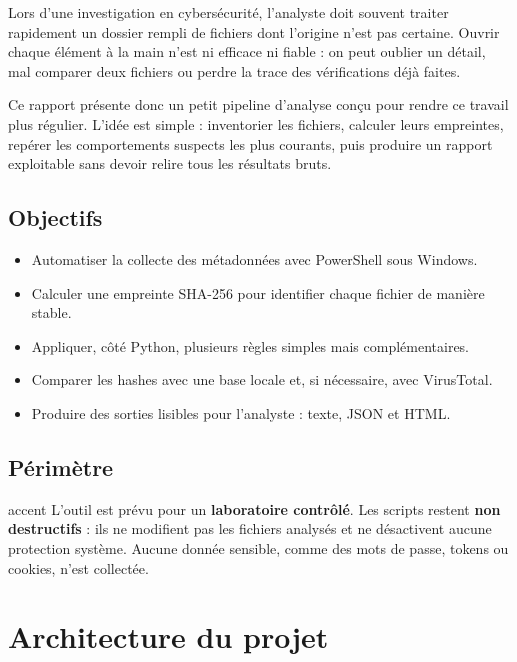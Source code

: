 \documentclass[12pt,a4paper]{article}
\begin{document}
Lors d'une investigation en cybersécurité, l'analyste doit souvent traiter rapidement un dossier rempli de fichiers dont l'origine n'est pas certaine. Ouvrir chaque élément à la main n'est ni efficace ni fiable : on peut oublier un détail, mal comparer deux fichiers ou perdre la trace des vérifications déjà faites.

Ce rapport présente donc un petit pipeline d'analyse conçu pour rendre ce travail plus régulier. L'idée est simple : inventorier les fichiers, calculer leurs empreintes, repérer les comportements suspects les plus courants, puis produire un rapport exploitable sans devoir relire tous les résultats bruts.

\subsection{Objectifs}

\begin{itemize}[itemsep=4pt]
  \item Automatiser la collecte des métadonnées avec PowerShell sous Windows.
  \item Calculer une empreinte SHA-256 pour identifier chaque fichier de manière stable.
  \item Appliquer, côté Python, plusieurs règles simples mais complémentaires.
  \item Comparer les hashes avec une base locale et, si nécessaire, avec VirusTotal.
  \item Produire des sorties lisibles pour l'analyste : texte, JSON et HTML.
\end{itemize}

\subsection{Périmètre}

\begin{riskbox}{accent}
  \color{white}
  L'outil est prévu pour un \textbf{laboratoire contrôlé}. Les scripts restent
  \textbf{non destructifs} : ils ne modifient pas les fichiers analysés et ne désactivent
  aucune protection système. Aucune donnée sensible, comme des mots de passe, tokens
  ou cookies, n'est collectée.
\end{riskbox}

\section{Architecture du projet}
\end{document}
